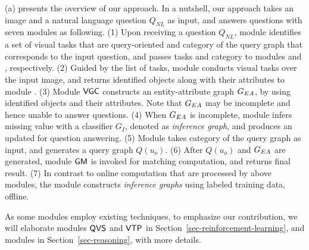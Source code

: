 
 (a) presents the overview of our approach. In a nutshell, our approach takes an image and a natural language question $Q_{NL}$ as input, and answers questions with seven modules as following. (1) Upon receiving a question $Q_{NL}$, module  identifies a set of visual tasks that are query-oriented and category of the query graph that corresponds to the input question, and passes tasks and category to modules  and , respectively. (2) Guided by the list of tasks, module  conducts visual tasks over the input image, and returns identified objects along with their attributes to module . (3) Module ${\mathsf{VGC}}$ constructs an entity-attribute graph $G_{EA}$, by using identified objects and their attributes. Note that $G_{EA}$ may be incomplete and hence unable to answer questions. (4) When $G_{EA}$ is incomplete, module  infers missing value with a classifier $G_I$, denoted as {\em inference graph}, and produces an updated  for question answering. (5) Module  takes category of the query graph as input, and generates a query graph $Q(u_o)$. (6) After $Q(u_o)$ and $G_{EA}$ are generated, module ${\mathsf{GM}}$ is invoked for matching computation, and returns final result. (7) In contrast to online computation that are processed by above modules, the module  constructs {\em inference graphs} using labeled training data, offline. 

As some modules employ existing techniques, to emphasize our contribution, we will elaborate modules ${\mathsf{QVS}}$ and ${\mathsf{VTP}}$ in Section~\ref{sec-reinforcement-learning}, and modules  in Section~\ref{sec-reasoning}, with more details. 